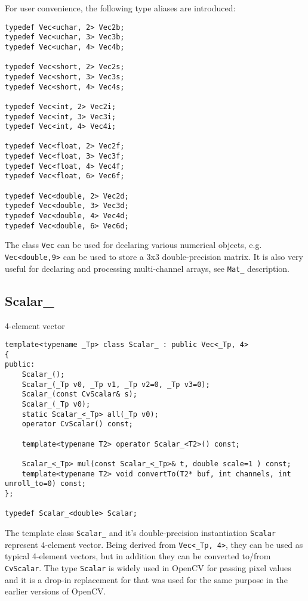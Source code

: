 For user convenience, the following type aliases are introduced:
\begin{lstlisting}
typedef Vec<uchar, 2> Vec2b;
typedef Vec<uchar, 3> Vec3b;
typedef Vec<uchar, 4> Vec4b;

typedef Vec<short, 2> Vec2s;
typedef Vec<short, 3> Vec3s;
typedef Vec<short, 4> Vec4s;

typedef Vec<int, 2> Vec2i;
typedef Vec<int, 3> Vec3i;
typedef Vec<int, 4> Vec4i;

typedef Vec<float, 2> Vec2f;
typedef Vec<float, 3> Vec3f;
typedef Vec<float, 4> Vec4f;
typedef Vec<float, 6> Vec6f;

typedef Vec<double, 2> Vec2d;
typedef Vec<double, 3> Vec3d;
typedef Vec<double, 4> Vec4d;
typedef Vec<double, 6> Vec6d;
\end{lstlisting}

The class \texttt{Vec} can be used for declaring various numerical objects, e.g. \texttt{Vec<double,9>} can be used to store a 3x3 double-precision matrix. It is also very useful for declaring and processing multi-channel arrays, see \texttt{Mat\_} description.

\subsection{Scalar\_}
4-element vector

\begin{lstlisting}
template<typename _Tp> class Scalar_ : public Vec<_Tp, 4>
{
public:
    Scalar_();
    Scalar_(_Tp v0, _Tp v1, _Tp v2=0, _Tp v3=0);
    Scalar_(const CvScalar& s);
    Scalar_(_Tp v0);
    static Scalar_<_Tp> all(_Tp v0);
    operator CvScalar() const;

    template<typename T2> operator Scalar_<T2>() const;

    Scalar_<_Tp> mul(const Scalar_<_Tp>& t, double scale=1 ) const;
    template<typename T2> void convertTo(T2* buf, int channels, int unroll_to=0) const;
};

typedef Scalar_<double> Scalar;
\end{lstlisting}

The template class \texttt{Scalar\_} and it's double-precision instantiation \texttt{Scalar} represent 4-element vector. Being derived from \texttt{Vec<\_Tp, 4>}, they can be used as typical 4-element vectors, but in addition they can be converted to/from \texttt{CvScalar}. The type \texttt{Scalar} is widely used in OpenCV for passing pixel values and it is a drop-in replacement for  that was used for the same purpose in the earlier versions of OpenCV.

